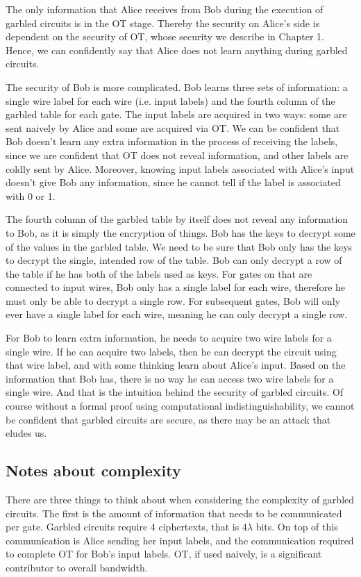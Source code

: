 The only information that Alice receives from Bob during the execution of garbled circuits is in the OT stage.
Thereby the security on Alice's side is dependent on the security of OT, whose security we describe in Chapter 1.
Hence, we can confidently say that Alice does not learn anything during garbled circuits.

The security of Bob is more complicated.
Bob learns three sets of information: a single wire label for each wire (i.e. input labels)  and the fourth column of the garbled table for each gate.
The input labels are acquired in two ways: some are sent naively by Alice and some are acquired via OT.
We can be confident that Bob doesn't learn any extra information in the process of receiving the labels, since we are confident that OT does not reveal information, and other labels are coldly sent by Alice.
Moreover, knowing input labels associated with Alice's input doesn't give Bob any information, since he cannot tell if the label is associated with 0 or 1.

The fourth column of the garbled table by itself does not reveal any information to Bob, as it is simply the encryption of things.
Bob has the keys to decrypt some of the values in the garbled table.
We need to be sure that Bob only has the keys to decrypt the single, intended row of the table.
Bob can only decrypt a row of the table if he has both of the labels used as keys.
For gates on that are connected to input wires, Bob only has a single label for each wire, therefore he must only be able to decrypt a single row.
For subsequent gates, Bob will only ever have a single label for each wire, meaning he can only decrypt a single row.

For Bob to learn extra information, he needs to acquire two wire labels for a single wire.
If he can acquire two labels, then he can decrypt the circuit using that wire label, and with some thinking learn about Alice's input.
Based on the information that Bob has, there is no way he can access two wire labels for a single wire.
And that is the intuition behind the security of garbled circuits.
Of course without a formal proof using computational indistinguishability, we cannot be confident that garbled circuits are secure, as there may be an attack that eludes us.

\subsection{Notes about complexity}
There are three things to think about when considering the complexity of garbled circuits.
The first is the amount of information that needs to be communicated per gate.
Garbled circuits require 4 ciphertexts, that is $4\lambda$ bits.
On top of this communication is Alice sending her input labels, and the communication required to complete OT for Bob's input labels.
OT, if used naively, is a significant contributor to overall bandwidth.

